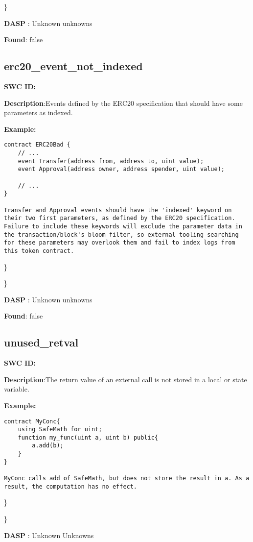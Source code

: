 \documentclass{article}
\begin{document}
\} 

\textbf{DASP} : Unknown unknowns

\textbf{Found}: false

\subsection{erc20\_event\_not\_indexed} 
\textbf{SWC \textunderscore ID:} 

\textbf{Description}:Events defined by the ERC20 specification that should have some parameters as indexed.


\textbf{Example:} 
\begin{verbatim}
contract ERC20Bad {
    // ...
    event Transfer(address from, address to, uint value);
    event Approval(address owner, address spender, uint value);

    // ...
}

Transfer and Approval events should have the 'indexed' keyword on their two first parameters, as defined by the ERC20 specification. Failure to include these keywords will exclude the parameter data in the transaction/block's bloom filter, so external tooling searching for these parameters may overlook them and fail to index logs from this token contract.

\end{verbatim}\} 

\} 

\textbf{DASP} : Unknown unknowns

\textbf{Found}: false

\subsection{unused\_retval} 
\textbf{SWC \textunderscore ID:} 

\textbf{Description}:The return value of an external call is not stored in a local or state variable.


\textbf{Example:} 
\begin{verbatim}
contract MyConc{
    using SafeMath for uint;
    function my_func(uint a, uint b) public{
        a.add(b);
    }
}

MyConc calls add of SafeMath, but does not store the result in a. As a result, the computation has no effect.

\end{verbatim}\} 

\} 

\textbf{DASP} : Unknown Unknowns
\end{document}
